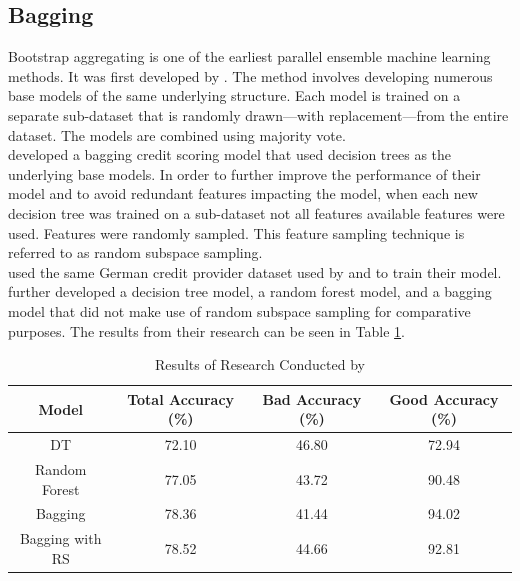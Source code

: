 \vspace{15pt}

\subsection{Bagging}

Bootstrap aggregating is one of the earliest parallel ensemble machine learning methods. It was first developed by \textcite{BagBri}. The method involves developing numerous base models of the same underlying structure. Each model is trained on a separate sub-dataset that is randomly drawn—with replacement—from the entire dataset. The models are combined using majority vote. \\

\textcite{BagWang} developed a bagging credit scoring model that used decision trees as the underlying base models. In order to further improve the performance of their model and to avoid redundant features impacting the model, when each new decision tree was trained on a sub-dataset not all features available features were used. Features were randomly sampled. This feature sampling technique is referred to as random subspace sampling. \\

\textcite{BagWang} used the same German credit provider dataset used by \textcite{NNWest} and \textcite{NNShen} to train their model. \textcite{BagWang} further developed a decision tree model, a random forest model, and a bagging model that did not make use of random subspace sampling for comparative purposes. The results from their research can be seen in Table \ref{table:bagging}. 


\vspace{15pt}

\begin{table}[H]
\begin{center}
\begin{tabular}{|c|c|c|c|} 
\hline
\multicolumn{1}{|c}{Model}  &\multicolumn{1}{|c|}{Total Accuracy (\%)}  &\multicolumn{1}{|c|}{Bad Accuracy (\%)} & \multicolumn{1}{c|}{Good Accuracy (\%)}\\
\hline
DT  & 72.10 &  46.80 & 72.94 \\
\hline
Random Forest & 77.05 & 43.72 & 90.48 \\
\hline
Bagging & 78.36 & 41.44 & 94.02 \\
\hline
Bagging with RS & 78.52 &  44.66 & 92.81 \\
\hline
\end{tabular}
\end{center}
\caption{Results of Research Conducted by \textcite{BagWang}}
\label{table:bagging}
\end{table}

